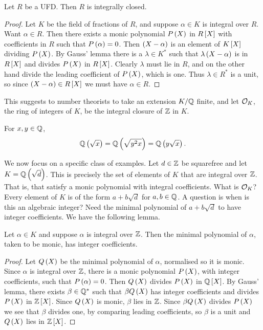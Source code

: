 \pagebreak

\begin{theorem}
Let $ R $ be a UFD. Then $ R $ is integrally closed.
\end{theorem}

\begin{proof}
Let $ K $ be the field of fractions of $ R $, and suppose $ \alpha \in K $ is integral over $ R $. Want $ \alpha \in R $. Then there exists a monic polynomial $ P\rb{X} $ in $ R\sb{X} $ with coefficients in $ R $ such that $ P\rb{\alpha} = 0 $. Then $ \rb{X - \alpha} $ is an element of $ K\sb{X} $ dividing $ P\rb{X} $. By Gauss' lemma there is a $ \lambda \in K^* $ such that $ \lambda\rb{X - \alpha} $ is in $ R\sb{X} $ and divides $ P\rb{X} $ in $ R\sb{X} $. Clearly $ \lambda $ must lie in $ R $, and on the other hand divide the leading coefficient of $ P\rb{X} $, which is one. Thus $ \lambda \in R^* $ is a unit, so since $ \rb{X - \alpha} \in R\sb{X} $ we must have $ \alpha \in R $.
\end{proof}

This suggests to number theorists to take an extension $ K / \Q $ finite, and let $ \OO_K $, the ring of integers of $ K $, be the integral closure of $ \Z $ in $ K $.

\begin{note*}
For $ x, y \in \Q $,
$$ \Q\rb{\sqrt{x}} = \Q\rb{\sqrt{y^2x}} = \Q\rb{y\sqrt{x}}. $$
\end{note*}

We now focus on a specific class of examples. Let $ d \in \Z $ be squarefree and let $ K = \Q\rb{\sqrt{d}} $. This is precisely the set of elements of $ K $ that are integral over $ \Z $. That is, that satisfy a monic polynomial with integral coefficients. What is $ \OO_K $? Every element of $ K $ is of the form $ a + b\sqrt{d} $ for $ a, b \in \Q $. A question is when is this an algebraic integer? Need the minimal polynomial of $ a + b\sqrt{d} $ to have integer coefficients. We have the following lemma.

\begin{lemma}
Let $ \alpha \in K $ and suppose $ \alpha $ is integral over $ \Z $. Then the minimal polynomial of $ \alpha $, taken to be monic, has integer coefficients.
\end{lemma}

\begin{proof}
Let $ Q\rb{X} $ be the minimal polynomial of $ \alpha $, normalised so it is monic. Since $ \alpha $ is integral over $ \Z $, there is a monic polynomial $ P\rb{X} $, with integer coefficients, such that $ P\rb{\alpha} = 0 $. Then $ Q\rb{X} $ divides $ P\rb{X} $ in $ \Q\sb{X} $. By Gauss' lemma, there exists $ \beta \in \Q^* $ such that $ \beta Q\rb{X} $ has integer coefficients and divides $ P\rb{X} $ in $ \Z\sb{X} $. Since $ Q\rb{X} $ is monic, $ \beta $ lies in $ \Z $. Since $ \beta Q\rb{X} $ divides $ P\rb{X} $ we see that $ \beta $ divides one, by comparing leading coefficients, so $ \beta $ is a unit and $ Q\rb{X} $ lies in $ \Z\sb{X} $.
\end{proof}

